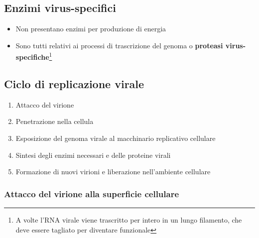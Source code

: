 \documentclass[italian,]{article}
\providecommand{\tightlist}{%
  \setlength{\itemsep}{0pt}\setlength{\parskip}{0pt}}
\begin{document}
\hypertarget{enzimi-virus-specifici}{%
\subsection{Enzimi virus-specifici}\label{enzimi-virus-specifici}}

\begin{itemize}
\tightlist
\item
  Non presentano enzimi per produzione di energia
\item
  Sono tutti relativi ai processi di trascrizione del genoma o
  \textbf{proteasi virus-specifiche}\footnote{A volte l'RNA virale viene
    trascritto per intero in un lungo filamento, che deve essere
    tagliato per diventare funzionale}
\end{itemize}

\hypertarget{ciclo-di-replicazione-virale}{%
\subsection{Ciclo di replicazione
virale}\label{ciclo-di-replicazione-virale}}

\begin{enumerate}
\def\labelenumi{\arabic{enumi}.}
\tightlist
\item
  Attacco del virione
\item
  Penetrazione nella cellula
\item
  Esposizione del genoma virale al macchinario replicativo cellulare
\item
  Sintesi degli enzimi necessari e delle proteine virali
\item
  Formazione di nuovi virioni e liberazione nell'ambiente cellulare
\end{enumerate}

\hypertarget{attacco-del-virione-alla-superficie-cellulare}{%
\subsubsection{Attacco del virione alla superficie
cellulare}\label{attacco-del-virione-alla-superficie-cellulare}}
\end{document}
